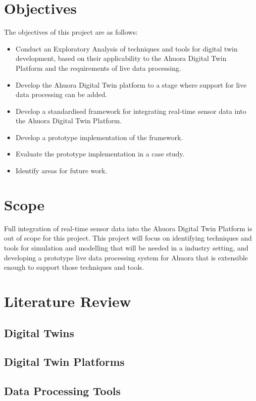 
\section{Objectives}

The objectives of this project are as follows:
\begin{itemize}
    \item Conduct an Exploratory Analysis of techniques and tools for digital twin development, based on their applicability to the Ahuora Digital Twin Platform and the requirements of live data processing.
    \item Develop the Ahuora Digital Twin platform to a stage where support for live data processing can be added.
    \item Develop a standardised framework for integrating real-time sensor data into the Ahuora Digital Twin Platform.
    \item Develop a prototype implementation of the framework.
    \item Evaluate the prototype implementation in a case study.
    \item Identify areas for future work.
\end{itemize}
\section{Scope}

Full integration of real-time sensor data into the Ahuora Digital Twin Platform is out of scope for this project.
This project will focus on identifying techniques and tools for simulation and modelling that will be needed in a industry setting,
and developing a prototype live data processing system for Ahuora that is extensible enough to support those techniques and tools.


\section{Literature Review}


\subsection{Digital Twins}

\subsection{Digital Twin Platforms}

\subsection{Data Processing Tools}

